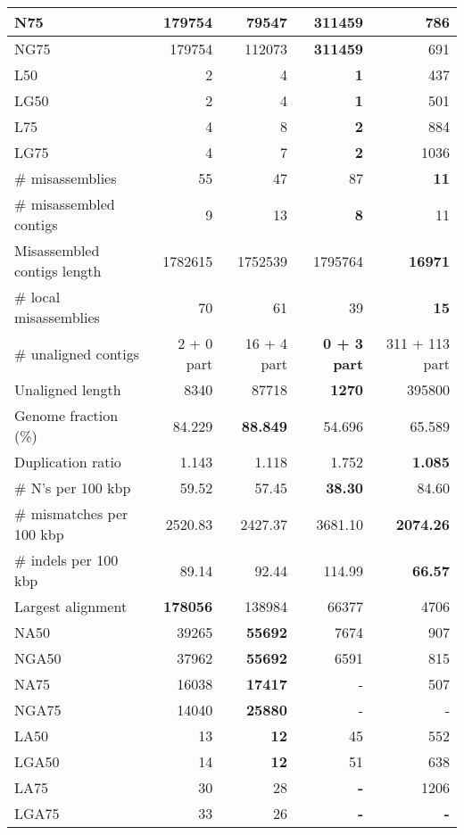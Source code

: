 \documentclass[12pt,a4paper]{article}
\begin{document}
\begin{table}[ht]
\begin{center}
\begin{tabular}{|l*{4}{|r}|}
N75 & 179754 & 79547 & {\bf 311459} & 786 \\ \hline
NG75 & 179754 & 112073 & {\bf 311459} & 691 \\ \hline
L50 & 2 & 4 & {\bf 1} & 437 \\ \hline
LG50 & 2 & 4 & {\bf 1} & 501 \\ \hline
L75 & 4 & 8 & {\bf 2} & 884 \\ \hline
LG75 & 4 & 7 & {\bf 2} & 1036 \\ \hline
\# misassemblies & 55 & 47 & 87 & {\bf 11} \\ \hline
\# misassembled contigs & 9 & 13 & {\bf 8} & 11 \\ \hline
Misassembled contigs length & 1782615 & 1752539 & 1795764 & {\bf 16971} \\ \hline
\# local misassemblies & 70 & 61 & 39 & {\bf 15} \\ \hline
\# unaligned contigs & 2 + 0 part & 16 + 4 part & {\bf 0 + 3 part} & 311 + 113 part \\ \hline
Unaligned length & 8340 & 87718 & {\bf 1270} & 395800 \\ \hline
Genome fraction (\%) & 84.229 & {\bf 88.849} & 54.696 & 65.589 \\ \hline
Duplication ratio & 1.143 & 1.118 & 1.752 & {\bf 1.085} \\ \hline
\# N's per 100 kbp & 59.52 & 57.45 & {\bf 38.30} & 84.60 \\ \hline
\# mismatches per 100 kbp & 2520.83 & 2427.37 & 3681.10 & {\bf 2074.26} \\ \hline
\# indels per 100 kbp & 89.14 & 92.44 & 114.99 & {\bf 66.57} \\ \hline
Largest alignment & {\bf 178056} & 138984 & 66377 & 4706 \\ \hline
NA50 & 39265 & {\bf 55692} & 7674 & 907 \\ \hline
NGA50 & 37962 & {\bf 55692} & 6591 & 815 \\ \hline
NA75 & 16038 & {\bf 17417} & - & 507 \\ \hline
NGA75 & 14040 & {\bf 25880} & - & - \\ \hline
LA50 & 13 & {\bf 12} & 45 & 552 \\ \hline
LGA50 & 14 & {\bf 12} & 51 & 638 \\ \hline
LA75 & 30 & 28 & {\bf -} & 1206 \\ \hline
LGA75 & 33 & 26 & {\bf -} & {\bf -} \\ \hline
\end{tabular}
\end{center}
\end{table}
\end{document}
